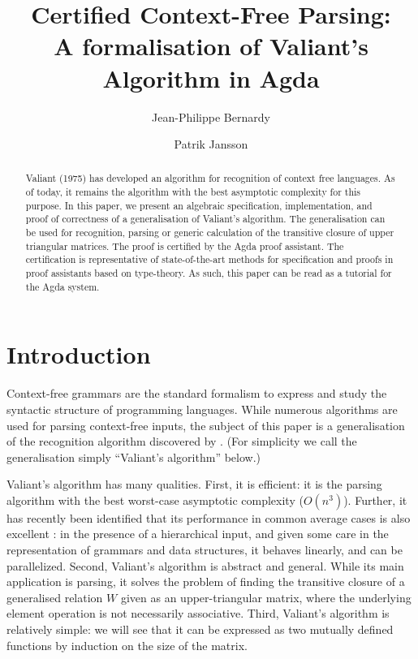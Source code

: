 \documentclass{CSML}
\numberwithin{theorem}{section}
\begin{document}
\title[Certified Context-Free Parsing]{Certified Context-Free Parsing:\\ A formalisation of Valiant's Algorithm in Agda}
\author[J.-P.~Bernardy]{Jean-Philippe Bernardy}
\address{Chalmers University of Technology \& University of Gothenburg, Sweden}
\author[P.~Jansson]{Patrik Jansson}
\address{\vspace{-18 pt}}



\begin{abstract}
  Valiant (1975) has developed an algorithm for recognition of context
  free languages.
  As of today, it remains the algorithm with the best asymptotic
  complexity for this purpose.
  In this paper, we present an algebraic specification,
  implementation, and proof of correctness of a generalisation of
  Valiant's algorithm.
  The generalisation can be used for recognition, parsing or generic
  calculation of the transitive closure of upper triangular matrices.
  The proof is certified by the Agda proof assistant.
  The certification is representative of state-of-the-art methods for
  specification and proofs in proof assistants based on type-theory.
  As such, this paper can be read as a tutorial for the Agda system.
\end{abstract}

\maketitle

\section*{Introduction}

Context-free grammars \citep{chomsky_syntactic_1957} are the standard
formalism to express and study the syntactic structure of programming
languages.  While numerous algorithms are used for parsing
context-free inputs, the subject of this paper is a generalisation of
the recognition algorithm discovered by \citet{valiant_general_1975}.  (For
simplicity we call the generalisation simply ``Valiant's algorithm''
below.)

Valiant's algorithm has many qualities. First, it is efficient:
it is the parsing algorithm with the best worst-case asymptotic complexity \citep{lee_fast_2002} ($O(n^3)$).
Further, it has recently been identified that its performance in
common average cases is also excellent \citep{bernardy_efficient_2015}:
in the presence of a hierarchical input, and given some care in the representation of grammars and data
structures, it behaves linearly, and can be parallelized.
Second, Valiant's algorithm is abstract and general. While its main
application is parsing, it solves the problem of finding the
transitive closure of a generalised relation $W$ given as an
upper-triangular matrix, where the underlying element operation is not
necessarily associative.
Third, Valiant's algorithm is relatively simple: we will see that it
can be expressed as two mutually defined functions by induction on the
size of the matrix.
\end{document}
